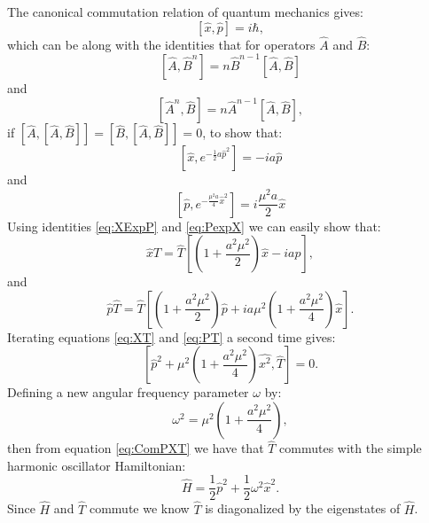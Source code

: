 \documentclass[12pt]{article}
\begin{document}
        The canonical commutation relation of quantum mechanics gives:
        \begin{equation}
            \label{eq:QMCCM}
            \left[\hat{x},\hat{p}\right] = i\hbar,
        \end{equation}
        which can be  along with the identities that for operators $\hat{A}$ and $\hat{B}$:
        \begin{equation}
            \label{eq:ComutationNIdentity1}
            \left[\hat{A},\hat{B}^n\right] = n\hat{B}^{n-1}\left[\hat{A},\hat{B}\right]
        \end{equation}
        and
        \begin{equation}
            \label{eq:ComutationNIdentity2}
            \left[\hat{A}^n,\hat{B}\right] = n\hat{A}^{n-1}\left[\hat{A},\hat{B}\right],
        \end{equation}
        if $\left[\hat{A},\left[\hat{A},\hat{B}\right]\right] = \left[\hat{B},\left[\hat{A},\hat{B}\right]\right] = 0 $, to show that:
        \begin{equation}
            \label{eq:XExpP}
            \left[\hat{x},e^{-\frac{1}{2}a\hat{p}^2}\right] = -ia\hat{p}
        \end{equation}
        and
        \begin{equation}
            \label{eq:PexpX}
            \left[\hat{p},e^{-\frac{\mu^2a}{4}\hat{x}^2}\right] = i\frac{\mu^2a}{2}\hat{x}
        \end{equation}
        Using identities \ref{eq:XExpP} and \ref{eq:PexpX} we can easily show that:
        \begin{equation}
            \label{eq:XT}
            \hat{x}\hat{T} = \hat{T}\left[\left(1+\frac{a^2\mu^2}{2}\right)\hat{x} - ia\hat{p}\right],
        \end{equation}
        and
        \begin{equation}
            \label{eq:PT}
            \hat{p}\hat{T} = \hat{T}\left[\left(1+\frac{a^2\mu^2}{2}\right)\hat{p}+ia\mu^2\left(1+\frac{a^2\mu^2}{4}\right)\hat{x}\right].
        \end{equation}
        Iterating equations \ref{eq:XT} and \ref{eq:PT} a second time gives:
        \begin{equation}
            \label{eq:ComPXT}
            \left[\hat{p}^2+\mu^2\left(1+\frac{a^2\mu^2}{4}\right)\hat{x^2},\hat{T}\right] = 0.
        \end{equation}
        Defining a new angular frequency parameter $\omega$ by:
        \begin{equation}
            \label{eq:omega}
            \omega^2 = \mu^2\left(1+\frac{a^2\mu^2}{4}\right),
        \end{equation}
        then from equation \ref{eq:ComPXT} we have that $\hat{T}$ commutes with the simple harmonic oscillator Hamiltonian:
        \begin{equation}
            \label{eq:OmegaHamiltonian}
            \hat{H} = \frac{1}{2}\hat{p}^2+\frac{1}{2}\omega^2\hat{x}^2.
        \end{equation}
        Since $\hat{H}$ and $\hat{T}$ commute we know $\hat{T}$ is diagonalized by the eigenstates of $\hat{H}$. 
\end{document}
